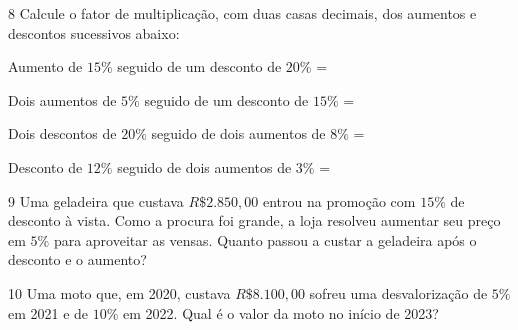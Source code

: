 
\num{8} Calcule o fator de multiplicação, com duas casas decimais, dos
aumentos e descontos sucessivos abaixo:
    
\begin{escolha}[itemsep=0pt]
    \item Aumento de $15\%$ seguido de um desconto de $20\%$  =  \\
    \item Dois aumentos de $5\%$ seguido de um desconto de $15\%$  =  \\
    \item Dois descontos de $20\%$ seguido de dois aumentos de $8\%$  =  \\
    \item Desconto de $12\%$ seguido de dois aumentos de $3\%$  =  
\end{escolha}

\num{9} Uma geladeira que custava $R\$2.850,00$ entrou na promoção com $15\%$ de
desconto à vista. Como a procura foi grande, a loja resolveu aumentar
seu preço em $5\%$ para aproveitar as vensas. Quanto passou a custar a
geladeira após o desconto e o aumento?


\num{10} Uma moto que, em 2020, custava $R\$8.100,00$ sofreu uma desvalorização
de $5\%$ em 2021 e de $10\%$ em 2022. Qual é o valor da moto no início de
2023?


